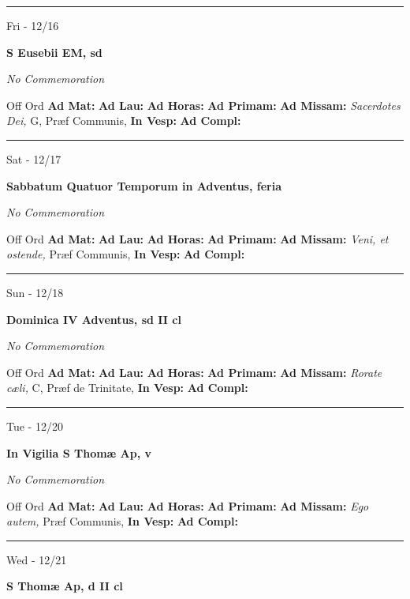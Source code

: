 \documentclass[letterpaper, 10pt]{article}
\begin{document}
\hrule
\begin{center}
Fri - 12/16
\end{center}\textbf{ \large S Eusebii EM, \textnormal{\normalsize sd}}

\textit{No Commemoration}\begin{justify}
Off Ord
\textbf{Ad Mat: }
\textbf{Ad Lau: }
\textbf{Ad Horas: }
\textbf{Ad Primam: }
\textbf{Ad Missam:} \textit{Sacerdotes Dei, } G, Præf Communis, 
\textbf{In Vesp: }
\textbf{Ad Compl: }\end{justify}



\hrule
\begin{center}
Sat - 12/17
\end{center}\textbf{ \large Sabbatum Quatuor Temporum in Adventus, \textnormal{\normalsize feria}}

\textit{No Commemoration}\begin{justify}
Off Ord
\textbf{Ad Mat: }
\textbf{Ad Lau: }
\textbf{Ad Horas: }
\textbf{Ad Primam: }
\textbf{Ad Missam:} \textit{Veni, et ostende, } Præf Communis, 
\textbf{In Vesp: }
\textbf{Ad Compl: }\end{justify}



\hrule
\begin{center}
Sun - 12/18
\end{center}\textbf{ \large Dominica IV Adventus, \textnormal{\normalsize sd II cl}}

\textit{No Commemoration}\begin{justify}
Off Ord
\textbf{Ad Mat: }
\textbf{Ad Lau: }
\textbf{Ad Horas: }
\textbf{Ad Primam: }
\textbf{Ad Missam:} \textit{Rorate cæli, } C, Præf de Trinitate, 
\textbf{In Vesp: }
\textbf{Ad Compl: }\end{justify}



\hrule
\begin{center}
Tue - 12/20
\end{center}\textbf{ \large In Vigilia S Thomæ Ap, \textnormal{\normalsize v}}

\textit{No Commemoration}\begin{justify}
Off Ord
\textbf{Ad Mat: }
\textbf{Ad Lau: }
\textbf{Ad Horas: }
\textbf{Ad Primam: }
\textbf{Ad Missam:} \textit{Ego autem, } Præf Communis, 
\textbf{In Vesp: }
\textbf{Ad Compl: }\end{justify}



\hrule
\begin{center}
Wed - 12/21
\end{center}\textbf{ \large S Thomæ Ap, \textnormal{\normalsize d II cl}}
\end{document}
